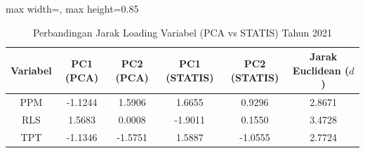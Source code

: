 \begin{table}[H]
\centering
\caption{Perbandingan Jarak Loading Variabel (PCA vs STATIS) Tahun 2021} \label{tab:samplejarak_loading_2021}
\begin{adjustbox}{max width=\textwidth, max height=0.85\textheight}
\begin{tabular}{|c|c|c|c|c|c|}
\hline
\textbf{Variabel} & \textbf{PC1 (PCA)} & \textbf{PC2 (PCA)} & \textbf{PC1 (STATIS)} & \textbf{PC2 (STATIS)} & \textbf{Jarak Euclidean ($d$)} \\
\hline
PPM & -1.1244 & 1.5906 & 1.6655 & 0.9296 & 2.8671 \\
RLS & 1.5683 & 0.0008 & -1.9011 & 0.1550 & 3.4728 \\
TPT & -1.1346 & -1.5751 & 1.5887 & -1.0555 & 2.7724 \\
\hline
\end{tabular}
\end{adjustbox}
\end{table}
